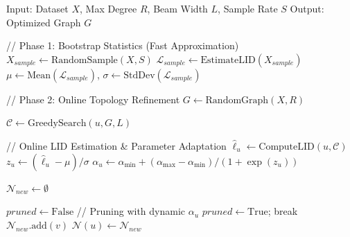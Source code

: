 \documentclass{article}
\theoremstyle{plain}
\theoremstyle{definition}
\theoremstyle{remark}
\begin{document}
\begin{algorithm}[h!]
   \caption{Online Manifold-Consistent Graph Indexing}
   \label{alg:online_mcgi}
\begin{algorithmic}
   \STATE Input: Dataset $X$, Max Degree $R$, Beam Width $L$, Sample Rate $S$
   \STATE Output: Optimized Graph $G$

   \STATE
   \STATE // Phase 1: Bootstrap Statistics (Fast Approximation)
   \STATE $X_{sample} \leftarrow \text{RandomSample}(X, S)$
   \STATE $\mathcal{L}_{sample} \leftarrow \text{EstimateLID}(X_{sample})$ 
   \STATE $\mu \leftarrow \text{Mean}(\mathcal{L}_{sample})$, $\sigma \leftarrow \text{StdDev}(\mathcal{L}_{sample})$

   \STATE 
   \STATE // Phase 2: Online Topology Refinement
   \STATE $G \leftarrow \text{RandomGraph}(X, R)$
   
           \STATE $\mathcal{C} \leftarrow \text{GreedySearch}(u, G, L)$
           
           \STATE // Online LID Estimation \& Parameter Adaptation
           \STATE $\hat{\ell}_u \leftarrow \text{ComputeLID}(u, \mathcal{C})$ 
           \STATE $z_u \leftarrow (\hat{\ell}_u - \mu) / \sigma$
           \STATE $\alpha_u \leftarrow \alpha_{\min} + (\alpha_{\max} - \alpha_{\min}) / (1 + \exp(z_u))$

           \STATE $\mathcal{N}_{new} \leftarrow \emptyset$
           
               \STATE $pruned \leftarrow \text{False}$
                   \STATE // Pruning with dynamic $\alpha_u$
                       \STATE $pruned \leftarrow \text{True}$; break
                   \ENDIF
               \ENDFOR
                   \STATE $\mathcal{N}_{new}.\text{add}(v)$
               \ENDIF
           \ENDFOR
           \STATE $\mathcal{N}(u) \leftarrow \mathcal{N}_{new}$
       \ENDFOR
   \ENDFOR
\end{algorithmic}
\end{algorithm}
\end{document}
